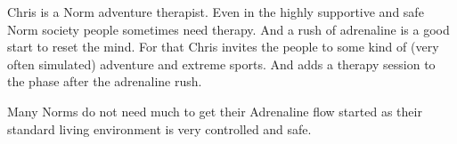\begin{npcBox}[title=Chris - a Norm adventure therapist]
    \begin{consequences}
    \item {}
    \item {}
    \item {}
    \end{consequences}

    \begin{npcDescription}
    Chris is a Norm adventure therapist. Even in the highly supportive and safe Norm society people sometimes need therapy. And a rush of adrenaline is a good start to reset the mind.
    For that Chris invites the people to some kind of (very often simulated) adventure and extreme sports. And adds a therapy session to the phase after the adrenaline rush.

    Many Norms do not need much to get their Adrenaline flow started as their standard living environment is very controlled and safe.
    \end{npcDescription}

\end{npcBox}

\newpage

